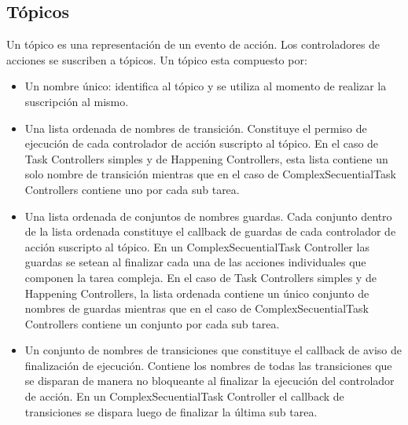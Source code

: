\subsection{Tópicos}
\label{sec:diseno_topicos}
Un tópico es una representación de un evento de acción. Los controladores de
acciones se suscriben a tópicos.
Un tópico esta compuesto por:
\begin{itemize}
  \item Un nombre único: identifica al tópico y se utiliza al momento de
  realizar la suscripción al mismo.
  \item Una lista ordenada de nombres de transición. Constituye el permiso
  de ejecución de cada controlador de acción suscripto al tópico. En el caso de
  Task Controllers simples y de Happening Controllers, esta lista contiene
  un solo nombre de transición mientras que en el caso de ComplexSecuentialTask
  Controllers contiene uno por cada sub tarea.
  \item Una lista ordenada de conjuntos de nombres guardas. Cada conjunto
   dentro de la lista ordenada constituye el callback de guardas de cada
   controlador de acción suscripto al tópico. En un ComplexSecuentialTask
   Controller las guardas se setean al finalizar cada una de las acciones
   individuales que componen la tarea compleja. En el caso de
  Task Controllers simples y de Happening Controllers, la lista ordenada
  contiene un único conjunto de nombres de guardas mientras que en el caso de
  ComplexSecuentialTask Controllers contiene un conjunto por cada sub tarea.
  \item Un conjunto de nombres de transiciones que constituye el callback de
  aviso de finalización de ejecución. Contiene los nombres de todas las
  transiciones que se disparan de manera no bloqueante al finalizar la ejecución
  del controlador de acción. En un  ComplexSecuentialTask
  Controller el callback de transiciones se dispara luego de finalizar la última
  sub tarea.
\end{itemize}
